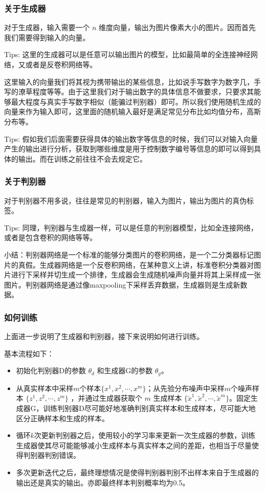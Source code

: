 \documentclass[12pt]{article}
\begin{document}
\subsubsection{关于生成器}
对于生成器，输入需要一个 $n$ 维度向量，输出为图片像素大小的图片。因而首先我们需要得到输入的向量。

Tips: 这里的生成器可以是任意可以输出图片的模型，比如最简单的全连接神经网络，又或者是反卷积网络等。

这里输入的向量我们将其视为携带输出的某些信息，比如说手写数字为数字几，手写的潦草程度等等。由于这里我们对于输出数字的具体信息不做要求，只要求其能够最大程度与真实手写数字相似（能骗过判别器）即可。所以我们使用随机生成的向量来作为输入即可，这里面的随机输入最好是满足常见分布比如均值分布，高斯分布等。

Tips: 假如我们后面需要获得具体的输出数字等信息的时候，我们可以对输入向量产生的输出进行分析，获取到哪些维度是用于控制数字编号等信息的即可以得到具体的输出。而在训练之前往往不会去规定它。

\subsubsection{关于判别器}
对于判别器不用多说，往往是常见的判别器，输入为图片，输出为图片的真伪标签。

Tips: 同理，判别器与生成器一样，可以是任意的判别器模型，比如全连接网络，或者是包含卷积的网络等等。

小结：判别器网络是一个标准的能够分类图片的卷积网络，是一个二分类器标记图片的真假。生成器网络是一个反卷积网络，在某种意义上讲，标准卷积分类器对图片进行下采样并切生成一个排律，生成器会生成随机噪声向量并将其上采样成一张图片。判别器网络是通过像maxpooling下采样丢弃数据，生成器则是生成新数据。

\subsubsection{如何训练}
上面进一步说明了生成器和判别器，接下来说明如何进行训练。

基本流程如下：
\begin{itemize}
\setlength{\itemsep}{0pt}
\setlength{\parsep}{0pt}
\setlength{\parskip}{0pt}
    \item 初始化判别器D的参数 $\theta_d$ 和生成器G的参数 $\theta_g$。
    \item 从真实样本中采样$m$个样本$\{x^1, x^2, \cdots, x^m\}$；从先验分布噪声中采样$m$个噪声样本  $\{z^1, z^2, \cdots, z^m\}$ ，并通过生成器获取个 $m$ 生成样本 $\{\tilde{x}^1 , \tilde{x}^2, \cdots, \tilde{x}^m\}$。固定生成器G，训练判别器D尽可能好地准确判别真实样本和生成样本，尽可能大地区分正确样本和生成的样本。
	\item 循环$k$次更新判别器之后，使用较小的学习率来更新一次生成器的参数，训练生成器使其尽可能能够减小生成样本与真实样本之间的差距，也相当于尽量使得判别器判别错误。
	\item 多次更新迭代之后，最终理想情况是使得判别器判别不出样本来自于生成器的输出还是真实的输出。亦即最终样本判别概率均为0.5。
\end{itemize}
\end{document}
